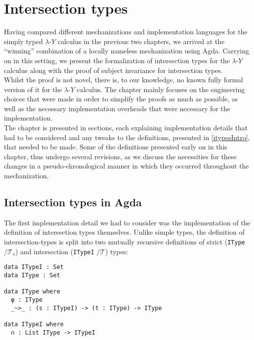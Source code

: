 \documentclass[a4paper, 12pt, twoside]{style/ociamthesis}
\theoremstyle{plain}
\theoremstyle{definition}
\theoremstyle{remark}
\newcommand{\lamy}{\lambda\text{-}Y}
\begin{document}
\newpage

\chapter{Intersection types}\label{intersection-types-1}

\label{chap:itypes}

Having compared different mechanizations and implementation languages
for the simply typed \(\lamy\) calculus in the previous two chapters, we
arrived at the ``winning'' combination of a locally nameless
mechanization using Agda. Carrying on in this setting, we present the
formalization of intersection types for the \(\lamy\) calculus along
with the proof of subject invariance for intersection types.\\
Whilst the proof is not novel, there is, to our knowledge, no known
fully formal version of it for the \(\lamy\) calculus. The chapter
mainly focuses on the engineering choices that were made in order to
simplify the proofs as much as possible, as well as the necessary
implementation overheads that were necessary for the implementation.\\
The chapter is presented in sections, each explaining implementation
details that had to be considered and any tweaks to the definitions,
presented in \cref{itypesIntro}, that needed to be made. Some of the
definitions presented early on in this chapter, thus undergo several
revisions, as we discuss the necessities for these changes in a
pseudo-chronological manner in which they occurred throughout the
mechanization.

\section{Intersection types in Agda}\label{intersection-types-in-agda}

\label{itypesAgda}

The first implementation detail we had to consider was the
implementation of the definition of intersection types themselves.
Unlike simple types, the definition of intersection-types is split into
two mutually recursive definitions of strict (\texttt{IType}
\(/\mathcal{T}_s\)) and intersection (\texttt{ITypeI} \(/\mathcal{T}\))
types:

\begin{verbatim}
data ITypeI : Set
data IType : Set

data IType where
  φ : IType
  _~>_ : (s : ITypeI) -> (t : IType) -> IType

data ITypeI where
  ∩ : List IType -> ITypeI
\end{verbatim}
\end{document}
